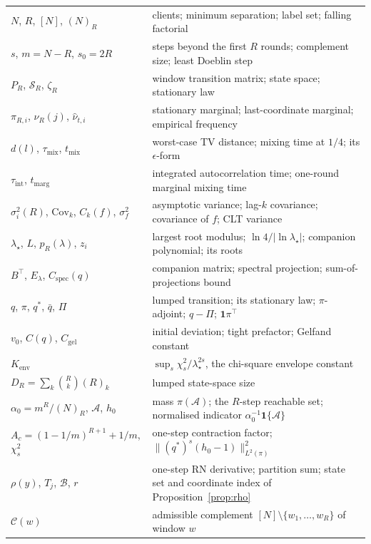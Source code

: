 \documentclass[twoside,11pt]{article}
\begin{document}
\setlength{\LTleft}{0pt}
\setlength{\LTright}{\fill}
\begin{longtable}{@{}lp{3.30in}@{}}
$N$, $R$, $[N]$, $(N)_R$ & clients; minimum separation; label set; falling factorial \\
$s$, $m=N-R$, $s_0=2R$ & steps beyond the first $R$ rounds; complement size; least Doeblin step \\
$P_R$, $\mathcal S_R$, $\zeta_R$ & window transition matrix; state space; stationary law \\
$\pi_{R,i}$, $\nu_R(j)$, $\hat\nu_{t,i}$ & stationary marginal; last-coordinate marginal; empirical frequency \\
$d(l)$, $\tau_{\mathrm{mix}}$, $t_{\mathrm{mix}}$ & worst-case TV distance; mixing time at $1/4$; its $\epsilon$-form \\
$\tau_{\mathrm{int}}$, $t_{\mathrm{marg}}$ & integrated autocorrelation time; one-round marginal mixing time \\
$\sigma_i^2(R)$, $\mathrm{Cov}_k$, $C_k(f)$, $\sigma_f^2$ & asymptotic variance; lag-$k$ covariance; covariance of $f$; CLT variance \\
$\lambda_\star$, $L$, $p_R(\lambda)$, $z_i$ & largest root modulus; $\ln4/|\ln\lambda_\star|$; companion polynomial; its roots \\
$B^\top$, $E_\lambda$, $C_{\mathrm{spec}}(q)$ & companion matrix; spectral projection; sum-of-projections bound \\
$q$, $\pi$, $q^*$, $\bar q$, $\Pi$ & lumped transition; its stationary law; $\pi$-adjoint; $q-\Pi$; $\mathbf 1\pi^\top$ \\
$v_0$, $C(q)$, $C_{\mathrm{gel}}$ & initial deviation; tight prefactor; Gelfand constant \\
$K_{\mathrm{env}}$ & $\sup_s\chi^2_s/\lambda_\star^{2s}$, the chi-square envelope constant \\
$D_R=\sum_k\binom Rk(R)_k$ & lumped state-space size \\
$\alpha_0=m^R/(N)_R$, $\mathcal{A}$, $h_0$ & mass $\pi(\mathcal{A})$; the $R$-step reachable set; normalised indicator $\alpha_0^{-1}\mathbf{1}\{\mathcal{A}\}$ \\
$A_c=(1-1/m)^{R+1}+1/m$, $\chi^2_s$ & one-step contraction factor; $\|(q^*)^s(h_0-1)\|_{L^2(\pi)}^2$ \\
$\rho(y)$, $T_j$, $\mathcal{B}$, $r$ & one-step RN derivative; partition sum; state set and coordinate index of Proposition~\ref{prop:rho} \\
$\mathcal{C}(w)$ & admissible complement $[N]\setminus\{w_1,\dots,w_R\}$ of window $w$ \\

\end{longtable}
\end{document}
